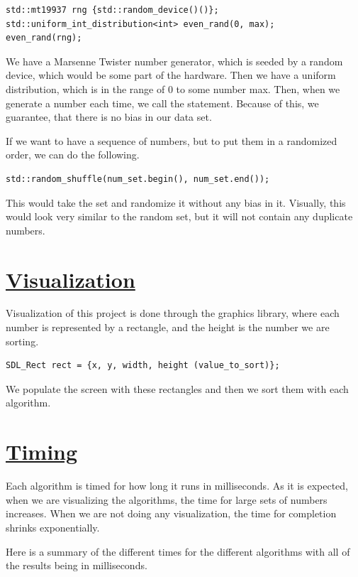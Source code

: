 \documentclass{article}
\newcommand{\code}[1]{\codeinline{\texttt{#1}}}
\begin{document}
\begin{lstlisting}
std::mt19937 rng {std::random_device()()};
std::uniform_int_distribution<int> even_rand(0, max);
even_rand(rng);
\end{lstlisting}

We have a Marsenne Twister number generator, which is seeded by a random device, which would be some part of the hardware. Then we have a uniform distribution, which is in the range of 0 to some number max. Then, when we generate a number each time, we call the \code{even\_rand(rng)} statement. Because of this, we guarantee, that there is no bias in our data set.

If we want to have a sequence of numbers, but to put them in a randomized order, we can do the following.

\begin{lstlisting}
std::random_shuffle(num_set.begin(), num_set.end());
\end{lstlisting}

This would take the set and randomize it without any bias in it. Visually, this would look very similar to the random set, but it will not contain any duplicate numbers.

\section{\underline{Visualization}}

Visualization of this project is done through the \code{SDL2} graphics library, where each number is represented by a rectangle, and the height is the number we are sorting.

\begin{lstlisting}
SDL_Rect rect = {x, y, width, height (value_to_sort)};
\end{lstlisting}

We populate the screen with these rectangles and then we sort them with each algorithm.

\section{\underline{Timing}}

Each algorithm is timed for how long it runs in milliseconds. As it is expected, when we are visualizing the algorithms, the time for large sets of numbers increases. When we are not doing any visualization, the time for completion shrinks exponentially.

Here is a summary of the different times for the different algorithms with all of the results being in milliseconds.
\end{document}
